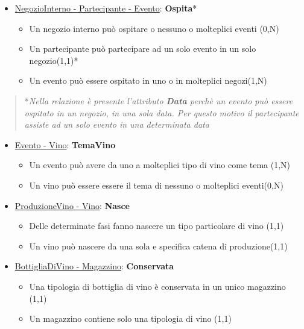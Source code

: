 \begin{itemize}
	\item \underline{NegozioInterno - Partecipante - Evento}: \textbf{Ospita}*
	
	\begin{itemize}
		\item Un negozio interno può ospitare o nessuno o molteplici eventi (0,N)
		\item Un partecipante può partecipare ad un solo evento in un solo negozio(1,1)*
		\item Un evento può essere ospitato in uno o in molteplici negozi(1,N)
	\end{itemize}
	
\end{itemize}

\begin{verse}
	*\emph{Nella relazione è presente l'attributo \textbf{Data} perchè un evento può essere ospitato in un negozio, in una sola data. Per questo motivo il partecipante assiste ad un solo evento in una determinata data}
\end{verse}

\begin{itemize}
	\item \underline{Evento - Vino}: \textbf{TemaVino}
	
	\begin{itemize}
		\item Un evento può avere da uno a molteplici tipo di vino come tema (1,N)
		\item Un vino può essere essere il tema di nessuno o molteplici eventi(0,N)
	\end{itemize}
	
\end{itemize}

\begin{itemize}
	\item \underline{ProduzioneVino - Vino}: \textbf{Nasce}
	
	\begin{itemize}
		\item Delle determinate fasi fanno nascere un tipo particolare di vino (1,1)
		\item Un vino può nascere da una sola e specifica catena di produzione(1,1)
	\end{itemize}
	
\end{itemize}

\begin{itemize}
	\item \underline{BottigliaDiVino - Magazzino}: \textbf{Conservata}
	
	\begin{itemize}
		\item Una tipologia di bottiglia di vino è conservata in un unico magazzino (1,1)
		\item Un magazzino contiene solo una tipologia di vino (1,1)
	\end{itemize}
	
\end{itemize}


